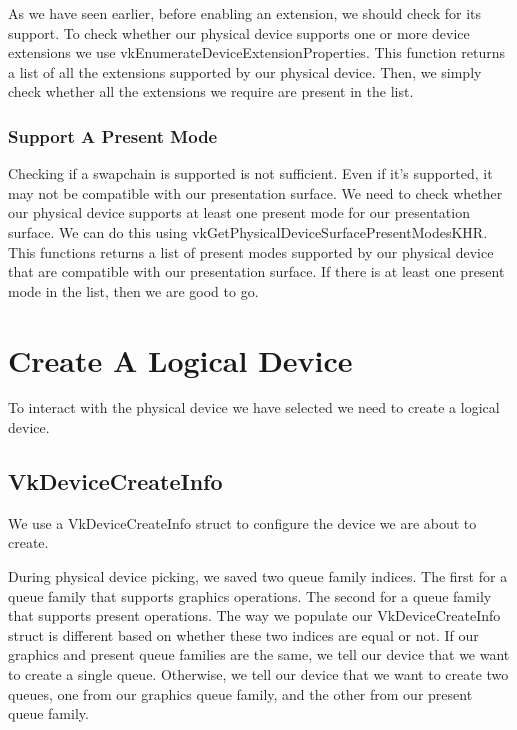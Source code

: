 As we have seen earlier, before enabling an extension, we should check for its
support.
To check whether our physical device supports one or more device extensions we use
vkEnumerateDeviceExtensionProperties.
This function returns a list of all the extensions supported by our physical device.
Then, we simply check whether all the extensions we require are present in the list.

\subsubsection{Support A Present Mode}

Checking if a swapchain is supported is not sufficient.
Even if it's supported, it may not be compatible with our presentation surface.
We need to check whether our physical device supports at least one present mode
for our presentation surface.
We can do this using vkGetPhysicalDeviceSurfacePresentModesKHR.
This functions returns a list of present modes supported by our physical device
that are compatible with our presentation surface.
If there is at least one present mode in the list, then we are good to go.

\section{Create A Logical Device}

To interact with the physical device we have selected we need to create
a logical device.

\begin{minipage}{\linewidth}{\noindent}
    
\end{minipage}

\subsection{VkDeviceCreateInfo}

We use a VkDeviceCreateInfo struct to configure the device we are about to
create.

During physical device picking, we saved two queue family indices.
The first for a queue family that supports graphics operations.
The second for a queue family that supports present operations.
The way we populate our VkDeviceCreateInfo struct is different based on whether
these two indices are equal or not.
If our graphics and present queue families are the same, we tell our device that
we want to create a single queue.
Otherwise, we tell our device that we want to create two queues, one from our
graphics queue family, and the other from our present queue family.

